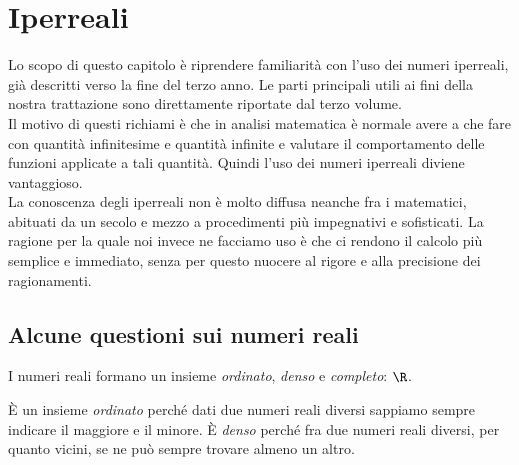 



\chapter{Iperreali}
\label{sec:01_introduzione}
Lo scopo di questo capitolo è riprendere familiarità con l'uso 
dei numeri iperreali, già descritti verso la fine del terzo anno. 
Le parti principali utili ai fini della nostra trattazione sono 
direttamente riportate dal terzo volume.\\
Il motivo di questi richiami è che in analisi matematica è normale 
avere a che fare con quantità infinitesime e quantità infinite e 
valutare il comportamento delle funzioni applicate a tali quantità. 
Quindi l'uso dei numeri iperreali diviene vantaggioso.\\
La conoscenza degli iperreali non è molto diffusa neanche fra i matematici, 
abituati da un secolo e mezzo a procedimenti più impegnativi e sofisticati.
La ragione per la quale noi invece ne facciamo uso è che ci rendono il 
calcolo 
più semplice e immediato, senza per questo nuocere al rigore e alla 
precisione dei ragionamenti.

\section{Alcune questioni sui numeri reali}
\label{sec:insnum_reali}

I numeri reali formano un insieme \emph{ordinato}, \emph{denso} e 
\emph{completo}: \(\R\). 

È un insieme \emph{ordinato} perché dati due numeri reali diversi sappiamo 
sempre indicare il maggiore e il minore. 
È \emph{denso} perché fra due numeri reali diversi, per quanto vicini, se ne 
può sempre trovare almeno un altro. 

